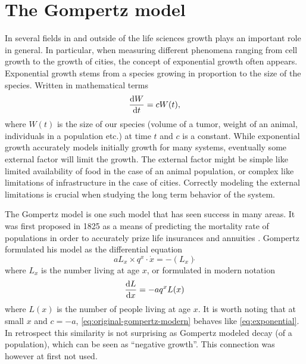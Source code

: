 \chapter{The Gompertz model}

In several fields in and outside of the life sciences growth plays an important role in general.
In particular, when measuring different phenomena ranging from cell growth to the growth of cities, the concept of exponential growth often appears.
Exponential growth stems from a species growing in proportion to the size of the species.
Written in mathematical terms
\begin{equation} \label{eq:exponential}
  \dv{W}{t} = c W(t),
\end{equation}
where \(W(t)\) is the size of our species (volume of a tumor, weight of an animal, individuals in a population etc.) at time \(t\) and \(c\) is a constant.
While exponential growth accurately models initially growth for many systems, eventually some external factor will limit the growth.
The external factor might be simple like limited availability of food in the case of an animal population, or complex like limitations of infrastructure in the case of cities. %
Correctly modeling the external limitations is crucial when studying the long term behavior of the system.

The Gompertz model is one such model that has seen success in many areas.
It was first proposed in 1825 as a means of predicting the mortality rate of populations in order to accurately prize life insurances and annuities \cite{gompertz1825nature}.
Gompertz formulated his model as the differential equation
\begin{equation} \label{eq:original-gompertz}
  a L_x \times q^x \cdot \dot{x} = - (L_x)\dot{}
\end{equation}
where \(L_x\) is the number living at age \(x\), or formulated in modern notation
\begin{equation} \label{eq:original-gompertz-modern}
  \dv{L}{x} = -a q^x L(x)
\end{equation}
where \(L(x)\) is the number of people living at age \(x\).
It is worth noting that at small \(x\) and \(c = -a\), \cref{eq:original-gompertz-modern} behaves like \cref{eq:exponential}.
In retrospect this similarity is not surprising as Gompertz modeled decay (of a population), which can be seen as \enquote{negative growth}.
This connection was however at first not used.


